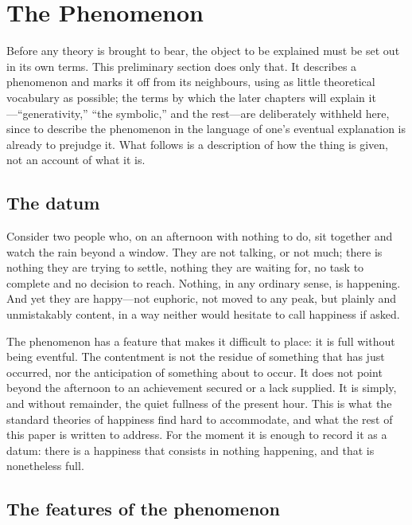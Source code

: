 \section*{The Phenomenon}
\label{p19:sec:phenomenon}

\noindent
Before any theory is brought to bear, the object to be explained must be set out in its own terms. This preliminary section does only that. It describes a phenomenon and marks it off from its neighbours, using as little theoretical vocabulary as possible; the terms by which the later chapters will explain it---``generativity,'' ``the symbolic,'' and the rest---are deliberately withheld here, since to describe the phenomenon in the language of one's eventual explanation is already to prejudge it. What follows is a description of how the thing is given, not an account of what it is.

\subsection*{The datum}
\label{p19:sub:phen-datum}

Consider two people who, on an afternoon with nothing to do, sit together and watch the rain beyond a window. They are not talking, or not much; there is nothing they are trying to settle, nothing they are waiting for, no task to complete and no decision to reach. Nothing, in any ordinary sense, is happening. And yet they are happy---not euphoric, not moved to any peak, but plainly and unmistakably content, in a way neither would hesitate to call happiness if asked.

The phenomenon has a feature that makes it difficult to place: it is full without being eventful. The contentment is not the residue of something that has just occurred, nor the anticipation of something about to occur. It does not point beyond the afternoon to an achievement secured or a lack supplied. It is simply, and without remainder, the quiet fullness of the present hour. This is what the standard theories of happiness find hard to accommodate, and what the rest of this paper is written to address. For the moment it is enough to record it as a datum: there is a happiness that consists in nothing happening, and that is nonetheless full.

\subsection*{The features of the phenomenon}
\label{p19:sub:phen-features}

